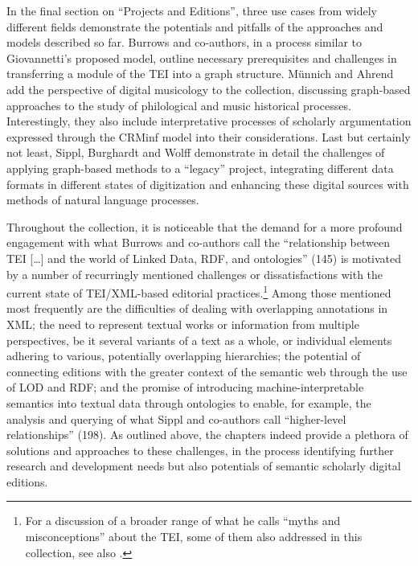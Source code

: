 \documentclass{article}
\begin{document}
In the final section on ``Projects and Editions'', three use cases from
widely different fields demonstrate the potentials and pitfalls of the
approaches and models described so far. Burrows and co-authors, in a
process similar to Giovannetti's proposed model, outline necessary
prerequisites and challenges in transferring a module of the TEI into a
graph structure. Münnich and Ahrend add the perspective of digital
musicology to the collection, discussing graph-based approaches to the
study of philological and music historical processes. Interestingly,
they also include interpretative processes of scholarly argumentation
expressed through the CRMinf model \parencite{stead_crminf_2015} into their
considerations. Last but certainly not least, Sippl, Burghardt and Wolff
demonstrate in detail the challenges of applying graph-based methods to
a ``legacy'' project, integrating different data formats in different
states of digitization and enhancing these digital sources with methods
of natural language processes.

Throughout the collection, it is noticeable that the demand for a more
profound engagement with what Burrows and co-authors call the
``relationship between TEI [\ldots] and the world of Linked Data,
RDF, and ontologies'' (145) is motivated by a number of recurringly
mentioned challenges or dissatisfactions with the current state of
TEI/XML-based editorial practices.\footnote{For a discussion of a
  broader range of what he calls ``myths and misconceptions'' about the
  TEI, some of them also addressed in this collection, see also \cite{cummings_world_2019}.} Among those mentioned most frequently are the difficulties of
dealing with overlapping annotations in XML; the need to represent
textual works or information from multiple perspectives, be it several
variants of a text as a whole, or individual elements adhering to
various, potentially overlapping hierarchies; the potential of
connecting editions with the greater context of the semantic web through
the use of LOD and RDF; and the promise of introducing
machine-interpretable semantics into textual data through ontologies to
enable, for example, the analysis and querying of what Sippl and
co-authors call ``higher-level relationships'' (198). As outlined above,
the chapters indeed provide a plethora of solutions and approaches to
these challenges, in the process identifying further research and
development needs but also potentials of semantic scholarly digital
editions.
\end{document}
